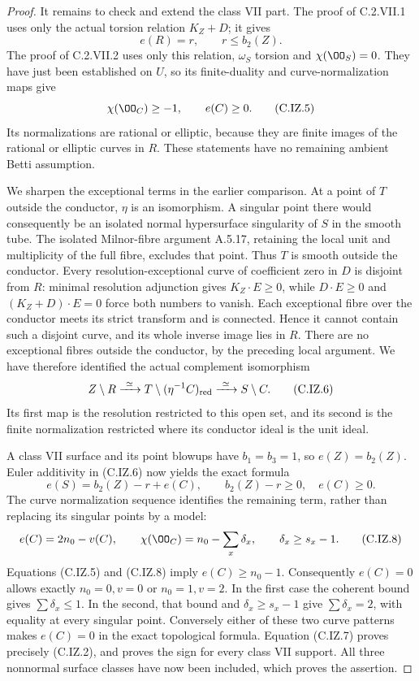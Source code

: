 \begin{proof}
It remains to check and extend the class VII part. The
proof of C.2.VII.1 uses only the actual torsion relation
$K_Z+D$; it gives
\[
 e(R)=r,\qquad r\le b_2(Z).                              \tag{C.IZ.4}
\]
The proof of C.2.VII.2 uses only this relation,
$\omega_S$ torsion and $\chi(\OO_S)=0$. They have just
been established on $U$, so its finite-duality and
curve-normalization maps give
\[
 \chi(\OO_C)\ge-1,\qquad e(C)\ge0.                      \tag{C.IZ.5}
\]
Its normalizations are rational or elliptic, because they
are finite images of the rational or elliptic curves in
$R$. These statements have no remaining ambient Betti
assumption.

We sharpen the exceptional terms in the earlier comparison.
At a point of $T$ outside the conductor, $\eta$ is an
isomorphism. A singular point there would consequently be
an isolated normal hypersurface singularity of $S$ in
the smooth tube. The isolated Milnor-fibre argument
A.5.17, retaining the local unit and multiplicity of
the full fibre, excludes that point. Thus $T$ is smooth
outside the conductor. Every resolution-exceptional curve
of coefficient zero in $D$ is disjoint from $R$: minimal
resolution adjunction gives $K_Z\cdot E\ge0$, while
$D\cdot E\ge0$ and $(K_Z+D)\cdot E=0$ force both
numbers to vanish. Each exceptional fibre over the
conductor meets its strict transform and is connected.
Hence it cannot contain such a disjoint curve, and its
whole inverse image lies in $R$. There are no exceptional
fibres outside the conductor, by the preceding local
argument. We have therefore identified the actual
complement isomorphism
\[
 Z\setminus R\xrightarrow{\ \simeq\ }
 T\setminus(\eta^{-1}C)_{\rm red}
 \xrightarrow{\ \simeq\ }S\setminus C.                \tag{C.IZ.6}
\]
Its first map is the resolution restricted to this open
set, and its second is the finite normalization restricted
where its conductor ideal is the unit ideal.

A class VII surface and its point blowups have
$b_1=b_3=1$, so $e(Z)=b_2(Z)$. Euler additivity in
(C.IZ.6) now yields the exact formula
\[
 e(S)=b_2(Z)-r+e(C),\qquad
 b_2(Z)-r\ge0,\quad e(C)\ge0.                           \tag{C.IZ.7}
\]
The curve normalization sequence identifies the remaining
term, rather than replacing its singular points by a
model:
\[
 e(C)=2n_0-v(C),\qquad
 \chi(\OO_C)=n_0-\sum_x\delta_x,\qquad
 \delta_x\ge s_x-1.                                    \tag{C.IZ.8}
\]
Equations (C.IZ.5) and (C.IZ.8) imply $e(C)\ge n_0-1$.
Consequently $e(C)=0$ allows exactly $n_0=0,v=0$ or
$n_0=1,v=2$. In the first case the coherent bound gives
$\sum\delta_x\le1$. In the second, that bound and
$\delta_x\ge s_x-1$ give $\sum\delta_x=2$, with equality
at every singular point. Conversely either of these
two curve patterns makes $e(C)=0$ in the exact
topological formula. Equation (C.IZ.7) proves precisely
(C.IZ.2), and proves the sign for every class VII
support. All three nonnormal surface classes have now
been included, which proves the assertion.
\end{proof}

